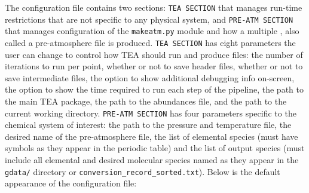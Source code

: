 {The configuration file contains two sections: \texttt{TEA SECTION}
that manages run-time restrictions that are not specific to any
physical system, and \texttt{PRE-ATM SECTION} that manages
configuration of the \texttt{makeatm.py} module and how a
multiple , also called a pre-atmosphere file is
produced.  \texttt{TEA SECTION} has eight parameters the user can
change to control how TEA should run and produce files: the number of
iterations to run per  point, whether or not to save header
files, whether or not to save intermediate files, the option to show
additional debugging info on-screen, the option to show the time
required to run each step of the pipeline, the path to the main TEA
package, the path to the abundances file, and the path to the current
working directory.
\texttt{PRE-ATM SECTION} has four parameters specific to the chemical
system of interest: the path to the pressure and temperature file, the
desired name of the pre-atmosphere file, the list of elemental species
(must have symbols as they appear in the periodic table) and the list
of output species (must include all elemental and desired molecular
species named as they appear in the \texttt{gdata/} directory
or \texttt{conversion\_record\_sorted.txt}). Below is the default
appearance of the configuration file:

}
